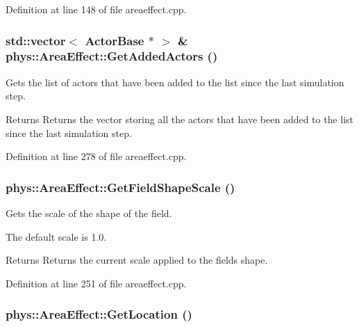 Definition at line 148 of file areaeffect.cpp.

\hypertarget{classphys_1_1AreaEffect_a72a9673c926ce876df630c4aecfc09f6}{
\subsubsection[{GetAddedActors}]{\setlength{\rightskip}{0pt plus 5cm}std::vector$<$ {\bf ActorBase} $\ast$ $>$ \& phys::AreaEffect::GetAddedActors ()}}
\label{d4/d55/classphys_1_1AreaEffect_a72a9673c926ce876df630c4aecfc09f6}


Gets the list of actors that have been added to the list since the last simulation step. 

\begin{DoxyReturn}{Returns}
Returns the vector storing all the actors that have been added to the list since the last simulation step. 
\end{DoxyReturn}


Definition at line 278 of file areaeffect.cpp.

\hypertarget{classphys_1_1AreaEffect_a251d82e373c6ada5b80c023434e513f6}{
\subsubsection[{GetFieldShapeScale}]{ phys::AreaEffect::GetFieldShapeScale ()}}
\label{d4/d55/classphys_1_1AreaEffect_a251d82e373c6ada5b80c023434e513f6}


Gets the scale of the shape of the field. 

The default scale is 1.0. \begin{DoxyReturn}{Returns}
Returns the current scale applied to the fields shape. 
\end{DoxyReturn}


Definition at line 251 of file areaeffect.cpp.

\hypertarget{classphys_1_1AreaEffect_a76040dd90ff314ea6973dccf4e90ba37}{
\subsubsection[{GetLocation}]{ phys::AreaEffect::GetLocation ()}}
\label{d4/d55/classphys_1_1AreaEffect_a76040dd90ff314ea6973dccf4e90ba37}


